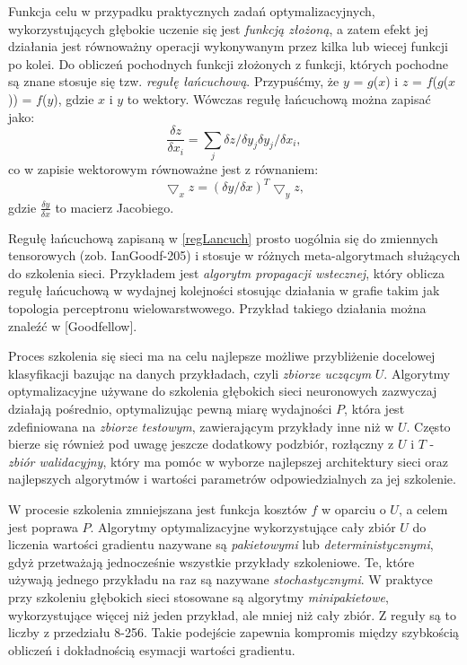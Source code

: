 Funkcja celu w przypadku praktycznych zadań optymalizacyjnych, wykorzystujących głębokie uczenie się jest \textit{funkcją złożoną}, a zatem efekt jej działania jest równoważny operacji wykonywanym przez kilka lub wiecej funkcji po kolei. Do obliczeń pochodnych funkcji złożonych z funkcji, których pochodne są znane stosuje się tzw. \textit{regułę łańcuchową}. Przypuśćmy, że $y$ = $g$($x$) i $z$ = $f$($g$($x$)) = $f$($y$), gdzie $x$ i $y$ to wektory. Wówczas regułę łańcuchową można zapisać jako:
\begin{equation}
\frac{\delta z}{\delta x_i} = \sum_{j} {\delta z}/{\delta y_j}{\delta y_j}/{\delta x_i}, 
\end{equation}
co w zapisie wektorowym równoważne jest z równaniem:
\begin{equation}
\label{regLancuch}
\bigtriangledown_x z = \left({\delta y}/{\delta x}\right)^T \bigtriangledown_y z, 
\end{equation}
gdzie $\frac{\delta y}{\delta x}$ to macierz Jacobiego. 

Regułę łańcuchową zapisaną w \ref{regLancuch} prosto uogólnia się do zmiennych tensorowych (zob. IanGoodf-205) i stosuje w różnych meta-algorytmach służących do szkolenia sieci. Przykładem jest \textit{algorytm propagacji wstecznej}, który oblicza regułę łańcuchową w wydajnej kolejności stosując działania w grafie takim jak topologia perceptronu wielowarstwowego. Przykład takiego działania można znaleźć w [Goodfellow].

Proces szkolenia się sieci ma na celu najlepsze możliwe przybliżenie docelowej klasyfikacji bazując na danych przykładach, czyli \textit{zbiorze uczącym} $U$. Algorytmy optymalizacyjne używane do szkolenia głębokich sieci neuronowych zazwyczaj działają pośrednio, optymalizując pewną miarę wydajności $P$, która jest zdefiniowana na \textit{zbiorze testowym}, zawierającym przykłady inne niż w $U$. Często bierze się również pod uwagę jeszcze dodatkowy podzbiór, rozłączny z $U$ i $T$ - \textit{zbiór walidacyjny}, który ma pomóc w wyborze najlepszej architektury sieci oraz najlepszych algorytmów i wartości parametrów odpowiedzialnych za jej szkolenie.

W procesie szkolenia zmniejszana jest funkcja kosztów $f$ w oparciu o $U$, a celem jest poprawa $P$. Algorytmy optymalizacyjne wykorzystujące cały zbiór $U$ do liczenia wartości gradientu nazywane są \textit{pakietowymi} lub \textit{deterministycznymi}, gdyż przetważają jednocześnie wszystkie przykłady szkoleniowe. Te, które używają jednego przykładu na raz są nazywane \textit{stochastycznymi}. W praktyce przy szkoleniu głębokich sieci stosowane są algorytmy \textit{minipakietowe}, wykorzystujące więcej niż jeden przykład, ale mniej niż cały zbiór. Z reguły są to liczby z przedziału 8-256. Takie podejście zapewnia kompromis między szybkością obliczeń i dokładnością esymacji wartości gradientu.

